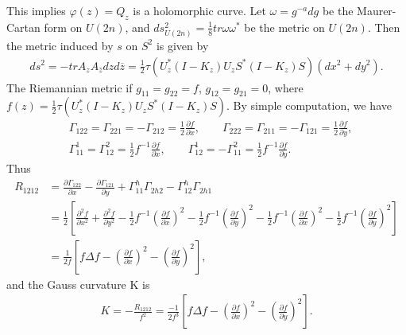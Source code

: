 \documentclass{amsart}
\begin{document}
This implies $\varphi(z) = Q_{z}$ is a holomorphic curve. Let $\omega = g^{-a}dg$ be the Maurer-Cartan form on $U(2n)$, and 
$ds^{2}_{U(2n)} = \frac{1}{8} tr \omega \omega^{*}$ be the metric on $U(2n)$. Then the metric induced by $s$ on $S^{2}$ is given by
\begin{align*}
ds^2 = - tr A_{z}A_{\overline{z}} dz d\overline{z} =  \frac{1}{2}\tau(U^{*}_{z}(I - K_{z})U_{z}S^{*}(I - K_z)S)(dx^{2} + dy^{2}).
\end{align*}
The Riemannian metric if $g_{11} = g_{22} = f$, $g_{12}= g_{21} = 0$, where $f(z) = \frac{1}{2}\tau(U^{*}_{z}(I - K_{z})U_{z}S^{*}(I - K_z)S)$.
By simple computation, we have
\begin{align*}
&\Gamma_{122} = \Gamma_{221} = - \Gamma_{212} = \frac{1}{2}\frac{\partial f}{\partial x}, \qquad
\Gamma_{222} = \Gamma_{211} = - \Gamma_{121} = \frac{1}{2}\frac{\partial f}{\partial y},\\
&\Gamma_{11}^{1} = \Gamma_{12}^{2} = \frac{1}{2}f^{-1}\frac{\partial f}{\partial x}, \qquad 
\Gamma_{12}^{1} = -\Gamma_{11}^{2} = \frac{1}{2}f^{-1}\frac{\partial f}{\partial y}.
\end{align*}
Thus
\begin{align*}
R_{1212} &= \frac{\partial \Gamma_{122}}{\partial x} - \frac{\partial \Gamma_{121}}{\partial y} + \Gamma_{11}^{h}\Gamma_{2h2} - \Gamma_{12}^{h}\Gamma_{2h1}\\
&= \frac{1}{2}\left[\frac{\partial^{2} f}{\partial x^2}   + \frac{\partial^{2} f}{\partial y^2}  - \frac{1}{2}f^{-1}(\frac{\partial f}{\partial x} )^{2} 
      -\frac{1}{2}f^{-1}(\frac{\partial f}{\partial y} )^{2}   - \frac{1}{2}f^{-1}(\frac{\partial f}{\partial x} )^{2} 
      -\frac{1}{2}f^{-1}(\frac{\partial f}{\partial y} )^{2}       \right]\\
&= \frac{1}{2f}\left[f\Delta f - (\frac{\partial f}{\partial x} )^{2} - (\frac{\partial f}{\partial y} )^{2}    \right],
\end{align*}
and the Gauss curvature K is 
\begin{align*}
K = -\frac{R_{1212}}{f^{2}} = \frac{-1}{2f^{3}}\left[f\Delta f - (\frac{\partial f}{\partial x} )^{2} - (\frac{\partial f}{\partial y} )^{2} \right] . 
\end{align*}
\end{document}

